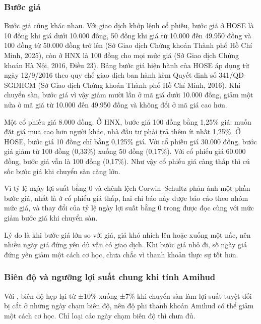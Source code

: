 \subsubsection*{Bước giá}

Bước giá cũng khác nhau. Với giao dịch khớp lệnh cổ phiếu, bước giá ở HOSE là 10 đồng khi giá dưới 10.000 đồng, 50 đồng khi giá từ 10.000 đến 49.950 đồng và 100 đồng từ 50.000 đồng trở lên (Sở Giao dịch Chứng khoán Thành phố Hồ Chí Minh, 2025), còn ở HNX là 100 đồng cho mọi mức giá (Sở Giao dịch Chứng khoán Hà Nội, 2016, Điều 23). Bảng bước giá hiện hành của HOSE áp dụng từ ngày 12/9/2016 theo quy chế giao dịch ban hành kèm Quyết định số 341/QĐ-SGDHCM (Sở Giao dịch Chứng khoán Thành phố Hồ Chí Minh, 2016). Khi chuyển sàn, bước giá vì vậy giảm mười lần ở mã giá dưới 10.000 đồng, giảm một nửa ở mã giá từ 10.000 đến 49.950 đồng và không đổi ở mã giá cao hơn.

\begin{vidu}
Một cổ phiếu giá 8.000 đồng. Ở HNX, bước giá 100 đồng bằng 1,25\% giá: muốn đặt giá mua cao hơn người khác, nhà đầu tư phải trả thêm ít nhất 1,25\%. Ở HOSE, bước giá 10 đồng chỉ bằng 0,125\% giá. Với cổ phiếu giá 30.000 đồng, bước giá giảm từ 100 đồng (0,33\%) xuống 50 đồng (0,17\%). Với cổ phiếu giá 60.000 đồng, bước giá vẫn là 100 đồng (0,17\%). Như vậy cổ phiếu giá càng thấp thì cú sốc bước giá khi chuyển sàn càng lớn.
\end{vidu}

Vì tỷ lệ ngày lợi suất bằng 0 và chênh lệch Corwin--Schultz phản ánh một phần bước giá, nhất là ở cổ phiếu giá thấp, hai chỉ báo này được báo cáo theo nhóm mức giá, và thay đổi của tỷ lệ ngày lợi suất bằng 0 trong  được đọc cùng với mức giảm bước giá khi chuyển sàn.

Lý do là khi bước giá lớn so với giá, giá khó nhích lên hoặc xuống một nấc, nên nhiều ngày giá đứng yên dù vẫn có giao dịch. Khi bước giá nhỏ đi, số ngày giá đứng yên giảm một cách cơ học, chưa chắc vì thanh khoản thực sự tốt hơn.

\subsubsection*{Biên độ và ngưỡng lợi suất chung khi tính Amihud}

Với , biên độ hẹp lại từ ±10\% xuống ±7\% khi chuyển sàn làm lợi suất tuyệt đối bị cắt ở những ngày chạm biên độ, nên độ phi thanh khoản Amihud có thể giảm một cách cơ học. Chỉ loại các ngày chạm biên độ thì chưa đủ.

